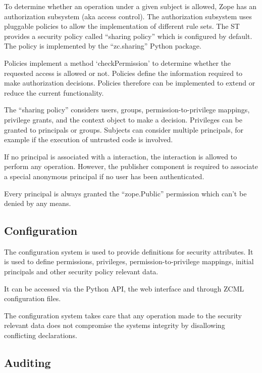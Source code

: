 \documentclass[12pt,english]{scrbook}
\begin{document}
To determine whether an operation under a given subject is allowed, Zope has an
authorization subsystem (aka access control). The authorization subsystem uses
pluggable policies to allow the implementation of different rule sets. The ST
provides a security policy called ``sharing policy'' which is configured by
default.  The policy is implemented by the ``zc.sharing'' Python package.

Policies implement a method `checkPermission' to determine whether the
requested access is allowed or not. Policies define the information required to
make authorization decisions.  Policies therefore can be implemented to extend
or reduce the current functionality.

The ``sharing policy'' considers users, groups, permission-to-privilege
mappings, privilege grants, and the context object to make a decision.
Privileges can be granted to principals or groups.  Subjects can consider
multiple principals, for example if the execution of untrusted code is
involved.

If no principal is associated with a interaction, the interaction is allowed to
perform any operation. However, the publisher component is required to
associate a special anonymous principal if no user has been authenticated.

Every principal is always granted the ``zope.Public'' permission which can't be
denied by any means.



\subsection{Configuration}

The configuration system is used to provide definitions for security
attributes. It is used to define permissions, privileges,
permission-to-privilege mappings, initial principals and other security policy
relevant data.

It can be accessed via the Python API, the web interface and
through ZCML configuration files.

The configuration system takes care that any operation made to the security
relevant data does not compromise the systems integrity by disallowing
conflicting declarations.

\subsection{Auditing}
\end{document}
